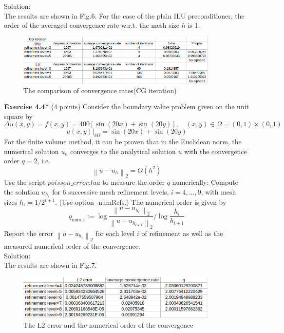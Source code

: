 \documentclass[a4paper]{article}
\begin{document}
\noindent Solution:\\
\noindent The results are shown in Fig.6. For the case of the plain ILU preconditioner, the order of the averaged convergence rate w.r.t. the mesh size $h$ is 1.\\
\begin{figure}[htbp]
	\centering
	\begin{minipage}[t]{0.7\textwidth}
		\centering		\includegraphics[width=10cm]{7.png}
		\caption{The comparison of convergence rates(CG iteration)}
	\end{minipage}
\end{figure}

\noindent \textbf{Exercise 4.4*} (4 points) Consider the boundary value problem given on the unit square by
$$
\Delta u(x, y)=f(x, y)=400[\sin (20 x)+\sin (20 y)], \quad(x, y) \in \Omega=(0,1) \times(0,1)
$$
$$
\left.u(x, y)\right|_{\delta \Omega}=\sin (20 x)+\sin (20 y)
$$
For the finite volume method, it can be proven that in the Euclidean norm, the numerical solution $u_{h}$ converges to the analytical solution $u$ with the convergence order $q=2$, i.e.
$$
\left\|u-u_{h}\right\|_{2}=O\left(h^{2}\right)
$$
Use the script $poisson\_error.lua$ to measure the order $q$ numerically: Compute the solution $u_{h_{i}}$ for 6 successive mesh refinement levels, $i=4, \ldots, 9$, with mesh sizes $h_{i}=1 / 2^{i+1}$. (Use option -numRefs.) The numerical order is given by
$$
q_{\mathrm{num}, i}:=\log \frac{\left\|u-u_{h_{i}}\right\|_{2}}{\left\|u-u_{h_{i+1}}\right\|_{2}} / \log \frac{h_{i}}{h_{i+1}}
$$
Report the error $\left\|u-u_{h_{i}}\right\|_{2}$ for each level $i$ of refinement as well as the measured numerical order of the convergence.\\

\noindent Solution:\\
\noindent The results are shown in Fig.7.\\
\begin{figure}[htbp]
	\centering
	\begin{minipage}[t]{0.7\textwidth}
		\centering		\includegraphics[width=10cm]{8.png}
		\caption{The L2 error and the numerical order of the convergence}
	\end{minipage}
\end{figure}
\end{document}
